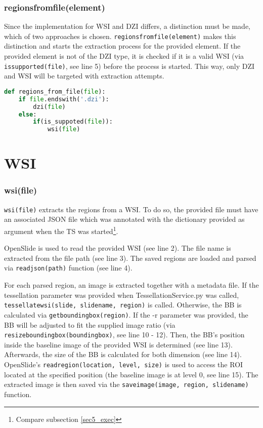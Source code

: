 \subsubsection{regions{\textunderscore}from{\textunderscore}file(element)}
Since the implementation for WSI and DZI differs, a distinction must be made, which of two approaches is chosen. \texttt{regions{\textunderscore}from{\textunderscore}file(element)} makes this distinction and starts the extraction process for the provided element. If the provided element is not of the DZI type, it is checked if it is a valid WSI (via \texttt{is{\textunderscore}supported(file)}, see line 5) before the process is started. This way, only DZI and WSI will be targeted with extraction attempts.
\begin{lstlisting}[frame=single,language=python]
def regions_from_file(file):
	if file.endswith('.dzi'):
		dzi(file)
	else:
		if(is_suppoted(file)):
			wsi(file)
\end{lstlisting}


\section{WSI}

\subsubsection{wsi(file)}
\texttt{wsi(file)} extracts the regions from a WSI. To do so, the provided file must have an associated JSON file which was annotated with the dictionary provided as argument when the TS was started\footnote{
	Compare subsection \ref{sec5_exec}
}.

OpenSlide is used to read the provided WSI (see line 2). The file name is extracted from the file path (see line 3). The saved regions are loaded and parsed via \texttt{read{\textunderscore}json(path)} function (see line 4).

For each parsed region, an image is extracted together with a metadata file. If the tessellation parameter was provided when TessellationService.py was called, \texttt{tessellate{\textunderscore}wsi(slide, slide{\textunderscore}name, region)} is called. Otherwise, the BB is calculated via \texttt{get{\textunderscore}bounding{\textunderscore}box(region)}. If the -r parameter was provided, the BB will be adjusted to fit the supplied image ratio (via \texttt{resize{\textunderscore}bounding{\textunderscore}box(bounding{\textunderscore}box)}, see line 10 - 12). Then, the BB's position inside the baseline image of the provided WSI is determined (see line 13). Afterwards, the size of the BB is calculated for both dimension (see line 14). OpenSlide's \texttt{read{\textunderscore}region(location, level, size)} is used to access the ROI located at the specified position (the baseline image is at level 0\cite{DICOM10}, see line 15). The extracted image is then saved via the \texttt{save{\textunderscore}image(image, region, slide{\textunderscore}name)} function.

